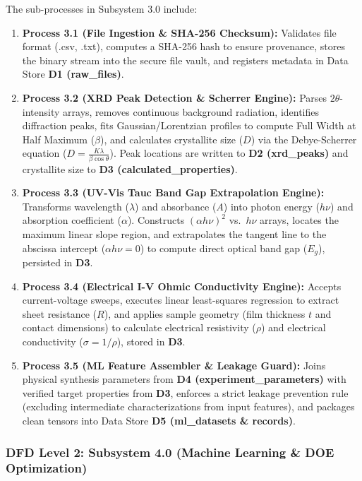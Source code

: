 \documentclass[12pt,a4paper,oneside]{report}
\begin{document}
{{{The sub-processes in Subsystem 3.0 include:
\begin{enumerate}
    \item \textbf{Process 3.1 (File Ingestion \& SHA-256 Checksum):} Validates file format (.csv, .txt), computes a SHA-256 hash to ensure provenance, stores the binary stream into the secure file vault, and registers metadata in Data Store \textbf{D1 (raw\_files)}.
    \item \textbf{Process 3.2 (XRD Peak Detection \& Scherrer Engine):} Parses $2\theta$-intensity arrays, removes continuous background radiation, identifies diffraction peaks, fits Gaussian/Lorentzian profiles to compute Full Width at Half Maximum ($\beta$), and calculates crystallite size ($D$) via the Debye-Scherrer equation ($D = \frac{K\lambda}{\beta \cos\theta}$). Peak locations are written to \textbf{D2 (xrd\_peaks)} and crystallite size to \textbf{D3 (calculated\_properties)}.
    \item \textbf{Process 3.3 (UV-Vis Tauc Band Gap Extrapolation Engine):} Transforms wavelength ($\lambda$) and absorbance ($A$) into photon energy ($h\nu$) and absorption coefficient ($\alpha$). Constructs $(\alpha h\nu)^2$ vs.\ $h\nu$ arrays, locates the maximum linear slope region, and extrapolates the tangent line to the abscissa intercept ($\alpha h\nu = 0$) to compute direct optical band gap ($E_g$), persisted in \textbf{D3}.
    \item \textbf{Process 3.4 (Electrical I-V Ohmic Conductivity Engine):} Accepts current-voltage sweeps, executes linear least-squares regression to extract sheet resistance ($R$), and applies sample geometry (film thickness $t$ and contact dimensions) to calculate electrical resistivity ($\rho$) and electrical conductivity ($\sigma = 1/\rho$), stored in \textbf{D3}.
    \item \textbf{Process 3.5 (ML Feature Assembler \& Leakage Guard):} Joins physical synthesis parameters from \textbf{D4 (experiment\_parameters)} with verified target properties from \textbf{D3}, enforces a strict leakage prevention rule (excluding intermediate characterizations from input features), and packages clean tensors into Data Store \textbf{D5 (ml\_datasets \& records)}.
\end{enumerate}

\subsubsection{DFD Level 2: Subsystem 4.0 (Machine Learning \& DOE Optimization)}

}}}
\end{document}
